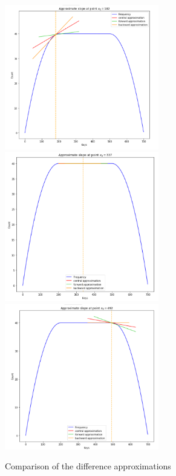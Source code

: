 \begin{figure}
    \centering
    \includegraphics[width=0.6\textwidth]{figures/approx_1.png}
    \includegraphics[width=0.6\textwidth]{figures/approx_2.png}
    \includegraphics[width=0.6\textwidth]{figures/approx_3.png}
    \caption{Comparison of the difference approximations}
    \label{fig:approximations}
\end{figure}

